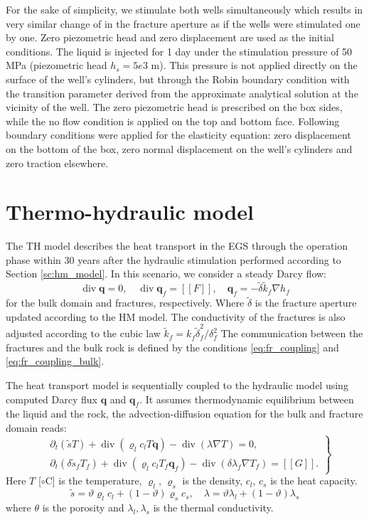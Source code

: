 \documentclass{article}
\renewcommand{\div}{\operatorname{div}}
\newcommand{\eq}[1]{\begin{equation}#1\end{equation}}
\newcommand{\jmp}[1]{[\![#1]\!]}
\newcommand{\vc}[1]{\boldsymbol{#1}}
\begin{document}
For the sake of simplicity, we stimulate both wells simultaneously which results in very similar change of in the fracture aperture as if the wells were stimulated one by one.
Zero piezometric head and zero displacement are used as the initial conditions. The liquid is injected for 1 day under the stimulation pressure of 50 MPa (piezometric head $h_s=5e3$ m). This pressure is not applied directly on the surface of the well's cylinders, but through the Robin boundary condition with the transition parameter derived from the approximate analytical solution at the vicinity of the well.
The zero piezometric head is prescribed on the box sides, while the no flow condition is applied on the top and bottom face. Following boundary conditions were applied for the elasticity equation: zero displacement on the bottom of the box, zero normal displacement on the well's cylinders and zero traction elsewhere.

\section{Thermo-hydraulic model}
The TH model describes the heat transport in the EGS through the operation phase within 30 years after the hydraulic stimulation performed according to Section \ref{sc:hm_model}. In this scenario, we consider a steady Darcy flow: 
\eq{ \label{th_darcy}
    \div \vc q = 0, \quad \div  \vc q_f =  \jmp F,\quad
    \vc q_f = -\tilde\delta \tilde k_f \nabla h_f
}
for the bulk domain and fractures, respectively. Where $\tilde \delta$ is the fracture aperture updated according to the HM model.
The conductivity of the fractures is also adjusted according to the cubic law $\tilde k_f = k_f\tilde\delta_f^2 / \delta_f^2$
The communication between the fractures and the bulk rock is defined by the conditions \eqref{eq:fr_coupling} and \eqref{eq:fr_coupling_bulk}.

The heat transport model is sequentially coupled to the hydraulic model using computed Darcy flux $\vc q$ and $\vc q_f$. It assumes thermodynamic equilibrium between the liquid and the rock, the advection-diffusion equation for the bulk and fracture domain reads:
\eq{
\left.\begin{aligned}
&\partial_t\left(\tilde s T \right) + \div(\varrho_l c_l T \vc q) - \div(\lambda\nabla T) = 0,\\
&\partial_t\left(\delta \tilde s_f T_f \right) + \div(\varrho_l c_l T_f \vc q_f) - \div(\delta\lambda_f\nabla T_f) = \jmp{G}.
\end{aligned}\right\}
}
Here $T$ [$\circ$C] is the temperature, $\varrho_l$, $\varrho_s$ is the density, $c_l$, $c_s$ is the heat capacity.
\eq{
\tilde s = \vartheta \varrho_l c_l + (1-\vartheta)\varrho_s c_s,\quad 
\lambda= \vartheta \lambda_l + (1-\vartheta)\lambda_s
}
where $\theta$ is the porosity and $\lambda_l,\lambda_s$ is the thermal conductivity.
\end{document}
